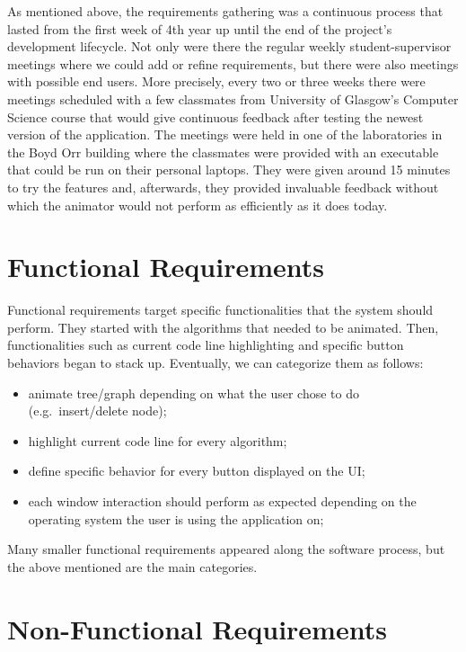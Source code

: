 \documentclass{l4proj}
\begin{document}
As mentioned above, the requirements gathering was a continuous process that lasted from the first week of 4th year up until the end of the project's development lifecycle. Not only were there the regular weekly student-supervisor meetings where we could add or refine requirements, but there were also meetings with possible end users. More precisely, every two or three weeks there were meetings scheduled with a few classmates from University of Glasgow's Computer Science course that would give continuous feedback after testing the newest version of the application. The meetings were held in one of the laboratories in the Boyd Orr building where the classmates were provided with an executable that could be run on their personal laptops. They were given around 15 minutes to try the features and, afterwards, they provided invaluable feedback without which the animator would not perform as efficiently as it does today.

\section{Functional Requirements}

Functional requirements target specific functionalities that the system should perform. They started with the algorithms that needed to be animated. Then, functionalities such as current code line highlighting and specific button behaviors began to stack up. Eventually, we can categorize them as follows:

\begin{itemize}
\item animate tree/graph depending on what the user chose to do (e.g.\ insert/delete node);
\item highlight current code line for every algorithm;
\item define specific behavior for every button displayed on the UI;
\item each window interaction should perform as expected depending on the operating system the user is using the
  application on;
\end{itemize}

Many smaller functional requirements appeared along the software process, but the above mentioned are the main categories.

\section{Non-Functional Requirements}
\end{document}
